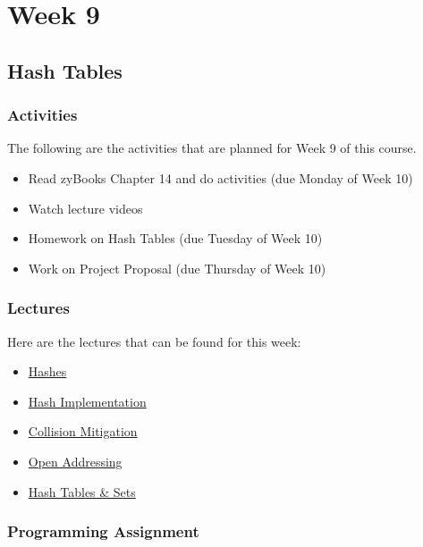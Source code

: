 \clearpage

\chapter{Week 9}

\section{Hash Tables}

\horizontalline

\subsection{Activities}

The following are the activities that are planned for Week 9 of this course.

\begin{itemize}
    \item Read zyBooks Chapter 14 and do activities (due Monday of Week 10)
    \item Watch lecture videos
    \item Homework on Hash Tables (due Tuesday of Week 10)
    \item Work on Project Proposal (due Thursday of Week 10)
\end{itemize}

\subsection{Lectures}

Here are the lectures that can be found for this week:

\begin{itemize}
    \item \href{https://applied.cs.colorado.edu/mod/hvp/view.php?id=46014}{Hashes}
    \item \href{https://applied.cs.colorado.edu/mod/hvp/view.php?id=46015}{Hash Implementation}
    \item \href{https://applied.cs.colorado.edu/mod/hvp/view.php?id=46016}{Collision Mitigation}
    \item \href{https://applied.cs.colorado.edu/mod/hvp/view.php?id=46017}{Open Addressing}
    \item \href{https://applied.cs.colorado.edu/mod/hvp/view.php?id=46018}{Hash Tables \& Sets}
\end{itemize}

\subsection{Programming Assignment}

